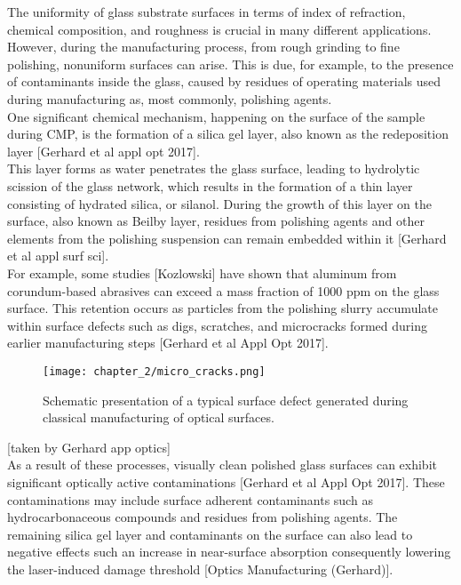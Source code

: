 The uniformity of glass substrate surfaces in terms of index of refraction, chemical composition, and roughness is crucial in many different applications. However, during the manufacturing process, from rough grinding to fine polishing, nonuniform surfaces can arise. This is due, for example, to the presence of contaminants inside the glass, caused by residues of operating materials used during manufacturing as, most commonly, polishing agents.
\\
One significant chemical mechanism, happening on the surface of the sample during CMP, is the formation of a silica gel layer, also known as the redeposition layer [Gerhard et al appl opt 2017].
\\
This layer forms as water penetrates the glass surface, leading to hydrolytic scission of the glass network, which results in the formation of a thin layer consisting of hydrated silica, or silanol. During the growth of this layer on the surface, also known as Beilby layer, residues from polishing agents and other elements from the polishing suspension can remain embedded within it [Gerhard et al appl surf sci].
\\
For example, some studies [Kozlowski] have shown that aluminum from corundum-based abrasives can exceed a mass fraction of 1000 ppm on the glass surface. This retention occurs as particles from the polishing slurry accumulate within surface defects such as digs, scratches, and microcracks formed during earlier manufacturing steps [Gerhard et al Appl Opt 2017].

\begin{figure}[H]
    \centering
    \texttt{[image: chapter\_2/micro\_cracks.png]}
    \caption[Schematic of a surface defect generated during optics manufacturing.]{ Schematic presentation of a typical surface defect generated
during classical manufacturing of optical surfaces. }
    \label{fig:micro_cracks}
\end{figure}
[taken by Gerhard app optics]
\\
As a result of these processes, visually clean polished glass surfaces can exhibit significant optically active contaminations [Gerhard et al Appl Opt 2017]. These contaminations may include surface adherent contaminants such as hydrocarbonaceous compounds and residues from polishing agents. The remaining silica gel layer and contaminants on the surface can also lead to negative effects such an increase in near-surface absorption consequently lowering the laser-induced damage threshold [Optics Manufacturing (Gerhard)].

